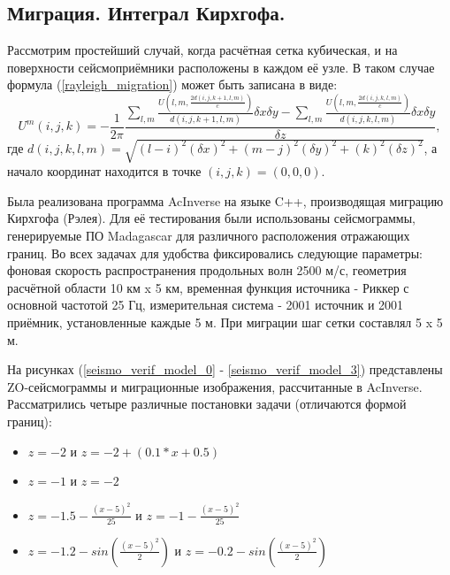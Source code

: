 \documentclass{article}
\begin{document}
\subsection{Миграция. Интеграл Кирхгофа.}

Рассмотрим простейший случай, когда расчётная сетка кубическая, и на поверхности сейсмоприёмники расположены в каждом её узле.
В таком случае формула (\ref{rayleigh_migration}) может быть записана в виде:
\begin{equation}
\label{rayleigh_migration_discrete}
U^m(i,j,k) = -\frac{1}{2\pi}\frac{\sum\limits_{l,m} \frac{U(l,m,\frac{2d(i,j,k+1,l,m)}{c})}{d(i,j,k+1,l,m)}\delta x \delta y - \sum\limits_{l,m} \frac{U(l,m,\frac{2d(i,j,k,l,m)}{c})}{d(i,j,k,l,m)}\delta x \delta y}{\delta z},
\end{equation}
где $d(i,j,k,l,m)=\sqrt{(l-i)^2(\delta x)^2 + (m-j)^2(\delta y)^2  + (k)^2(\delta z)^2}$, а начало координат находится в точке $(i,j,k)=(0,0,0)$.

Была реализована программа AcInverse на языке C++, производящая миграцию Кирхгофа (Рэлея).
Для её тестирования были использованы сейсмограммы, генерируемые ПО Madagascar для различного расположения отражающих границ.
Во всех задачах для удобства фиксировались следующие параметры: фоновая скорость распространения продольных волн 2500 м/с, геометрия расчётной области 10 км x 5 км,
временная функция источника - Риккер с основной частотой 25 Гц, измерительная система - 2001 источник и 2001 приёмник, установленные каждые 5 м.
При миграции шаг сетки составлял 5 x 5 м.

На рисунках (\ref{seismo_verif_model_0} - \ref{seismo_verif_model_3}) представлены ZO-сейсмограммы и миграционные изображения, рассчитанные в AcInverse.
Рассматрились четыре различные постановки задачи (отличаются формой границ):
\begin{itemize}
\item $z = -2$ и $z = -2 + (0.1 * x + 0.5)$
\item $z = -1$ и $z = -2$
\item $z = -1.5 - \frac{(x - 5)^2}{25}$ и $z = -1 - \frac{(x - 5)^2}{25}$
\item $z = -1.2 - sin(\frac{(x-5)^2}{2})$ и $z = -0.2 - sin(\frac{(x-5)^2}{2})$
\end{itemize}
\end{document}
